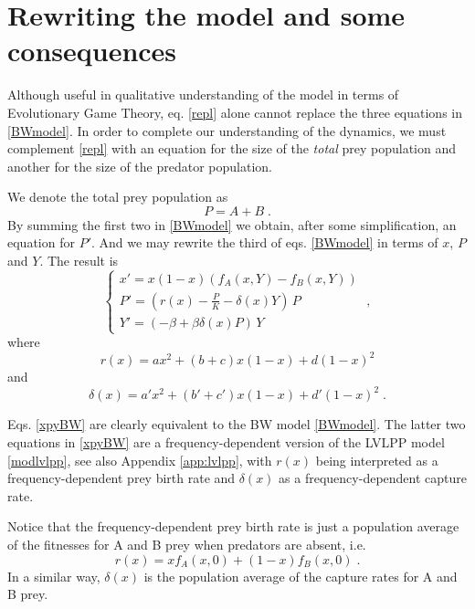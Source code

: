\documentclass[12pt]{article}
\theoremstyle{definition}
\begin{document}
\section{Rewriting the model and some consequences} \label{sec:rew}

Although useful in qualitative understanding of the model in terms of Evolutionary Game Theory, eq. \eqref{repl} alone cannot replace the three equations in \eqref{BWmodel}. In order to complete our understanding of the dynamics, we must complement \eqref{repl} with an equation for the size of the \textit{total} prey population and another for the size of the predator population.

We denote the total prey population as
\begin{equation} \label{totalprey}
	P=A+B\;.
\end{equation} 
By summing the first two in \eqref{BWmodel} we obtain, after some simplification, an equation for $P'$. And we may rewrite the third of eqs. \eqref{BWmodel} in terms of $x$, $P$ and $Y$. The result is
\begin{equation}  \label{xpyBW}
	\begin{cases} 
		x' = x(1-x)(f_A(x,Y)-f_B(x,Y))\\
		P' = (r(x) - \frac{P}{K} - \delta(x)Y)\, P\\
		Y' = ( -\beta + \beta \delta(x)P) \,Y
	\end{cases}\;,
\end{equation}
where
\begin{equation}\label{defr}
	r(x) = ax^2 + (b+c)x(1-x) + d(1-x)^2   
\end{equation}
and 
\begin{equation}\label{defdelta}
	\delta(x) = a'x^2 + (b'+c')x(1-x) + d'(1-x)^2\;.
\end{equation}

Eqs. \eqref{xpyBW} are clearly equivalent to the BW model \eqref{BWmodel}. The latter two equations in \eqref{xpyBW} are a frequency-dependent version of the LVLPP model \eqref{modlvlpp}, see also Appendix \ref{app:lvlpp}, with $r(x)$ being interpreted as a frequency-dependent prey birth rate and 
$\delta(x)$ as a frequency-dependent capture rate.

Notice that the frequency-dependent prey birth rate is just a population average of the fitnesses for A and B prey when predators are absent, i.e.
\begin{equation}  \label{xRaver}
	r(x)= x f_A(x,0)+(1-x) f_B(x,0)\;.
\end{equation}
In a similar way, $\delta(x)$ is the population average of the capture rates for A and B prey.
\end{document}

